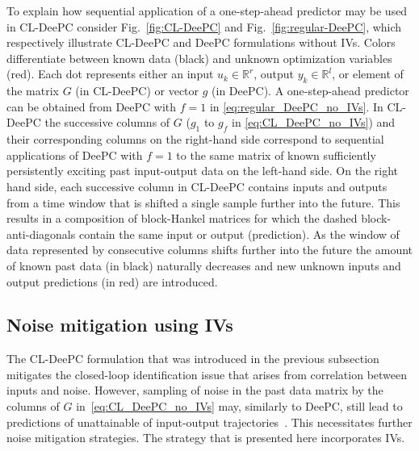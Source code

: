 To explain how sequential application of a one-step-ahead predictor may be used in \ac{CL-DeePC} consider Fig.~\ref{fig:CL-DeePC} and Fig.~\ref{fig:regular-DeePC}, which respectively illustrate \ac{CL-DeePC} and \ac{DeePC} formulations without \ac{IVs}. Colors differentiate between known data (black) and unknown optimization variables (red). Each dot represents either an input ${u_k\in\mathbb{R}^r}$, output ${y_k\in\mathbb{R}^l}$, or element of the matrix $G$ (in \ac{CL-DeePC}) or vector $g$ (in \ac{DeePC}). A one-step-ahead predictor can be obtained from \ac{DeePC} with $f=1$ in \eqref{eq:regular_DeePC_no_IVs}. In \ac{CL-DeePC} the successive columns of $G$ ($g_1$ to $g_f$ in \eqref{eq:CL_DeePC_no_IVs}) and their corresponding columns on the right-hand side correspond to sequential applications of \ac{DeePC} with $f=1$ to the same matrix of known sufficiently persistently exciting past input-output data on the left-hand side. On the right hand side, each successive column in \ac{CL-DeePC} contains inputs and outputs from a time window that is shifted a single sample further into the future. This results in a composition of block-Hankel matrices for which the dashed block-anti-diagonals contain the same input or output (prediction). As the window of data represented by consecutive columns shifts further into the future the amount of known past data (in black) naturally decreases and new unknown inputs and output predictions (in red) are introduced.

%
\subsection{Noise mitigation using \acl{IVs}}
\noindent The \ac{CL-DeePC} formulation that was introduced in the previous subsection mitigates the closed-loop identification issue that arises from correlation between inputs and noise. However, sampling of noise in the past data matrix by the columns of $G$ in~\eqref{eq:CL_DeePC_no_IVs} may, similarly to \ac{DeePC}, still lead to predictions of unattainable of input-output trajectories~\citep{Markovsky2022}. This necessitates further noise mitigation strategies. The strategy that is presented here incorporates \ac{IVs}. 

